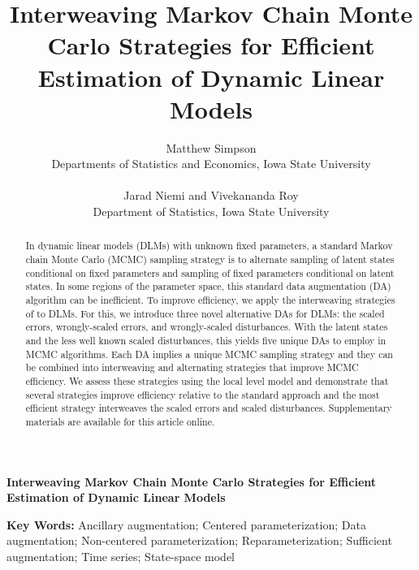\documentclass[12pt]{article}
\begin{document}
\def\spacingset#1{\renewcommand{\baselinestretch}%
{#1}\small\normalsize} \spacingset{1}
\setlength{\tabcolsep}{2pt}

\blind
{
  \title{\bf Interweaving Markov Chain Monte Carlo Strategies for Efficient
    Estimation of Dynamic Linear Models}
  \author{Matthew Simpson\\
    Departments of Statistics and Economics, Iowa State University\\~\\
    Jarad Niemi and Vivekananda Roy\\
    Department of Statistics, Iowa State University}
  \maketitle
} \fi

\blind
{
  \bigskip
  \bigskip
  \bigskip
  \begin{center}
    {\LARGE\bf Interweaving Markov Chain Monte Carlo Strategies for Efficient
    Estimation of Dynamic Linear Models}
\end{center}
  \medskip
} \fi

\bigskip


\begin{abstract}
In dynamic linear models (DLMs) with unknown fixed parameters, a standard Markov chain Monte Carlo (MCMC) sampling strategy is to alternate sampling of latent states conditional on fixed parameters and sampling of fixed parameters conditional on latent states. In some regions of the parameter space, this standard data augmentation (DA) algorithm can be inefficient. To improve efficiency, we apply the interweaving strategies of \citet{yu2011center} to DLMs. For this, we introduce three novel alternative DAs for DLMs: the scaled errors, wrongly-scaled errors, and wrongly-scaled disturbances. With the latent states and the less well known scaled disturbances, this yields five unique DAs to employ in MCMC algorithms. Each DA implies a unique MCMC sampling strategy and they can be combined into interweaving and alternating strategies that improve MCMC efficiency. We assess these strategies using the local level model and demonstrate that several strategies improve efficiency relative to the standard approach and the most efficient strategy interweaves the scaled errors and scaled disturbances. Supplementary materials are available for this article online.
\end{abstract}


\noindent%
{\bf Key Words:} Ancillary augmentation; Centered parameterization; Data augmentation; Non-centered parameterization; Reparameterization; Sufficient augmentation; Time series; State-space model
\end{document}
